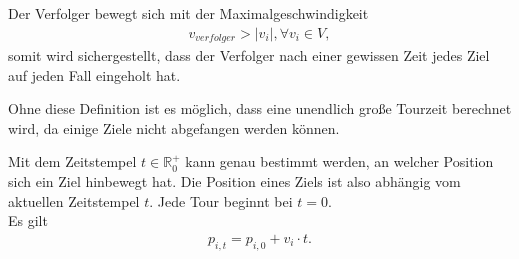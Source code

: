 \documentclass[german,version-2019-11]{uzl-thesis}
\begin{document}
\begin{definition}
Der Verfolger bewegt sich mit der Maximalgeschwindigkeit 
\begin{align*}
v_{verfolger} > |v_i|, \forall v_i\in V,
\end{align*}
somit wird sichergestellt, dass der Verfolger nach einer gewissen Zeit jedes Ziel auf jeden Fall eingeholt hat.
\end{definition} \noindent
Ohne diese Definition ist es möglich, dass eine unendlich große Tourzeit berechnet wird, da einige Ziele nicht abgefangen werden können.

\begin{definition}
\label{def:UpdatedPos}
Mit dem Zeitstempel $t\in \mathbb{R}^+_0$ kann genau bestimmt werden, an welcher Position sich ein Ziel hinbewegt hat. Die Position eines Ziels ist also abhängig vom aktuellen Zeitstempel $t$. Jede Tour beginnt bei $t=0$. \\
Es gilt
\begin{align*}
p_{i,t} = p_{i,0} + v_i\cdot t.
\end{align*} 
\end{definition}
\end{document}
